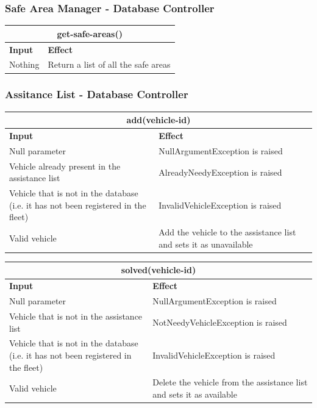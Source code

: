 \documentclass{article}
\begin{document}
\subsubsection{Safe Area Manager - Database Controller}
\begin{tabular}{ |p{5cm}|p{7cm}| }
  \hline
  \multicolumn{2}{|c|}{get-safe-areas()} \\
  \hline
  \textbf{Input} & \textbf{Effect} \\
  \hline
  Nothing & Return a list of all the safe areas\\
  \hline
\end{tabular}
\subsubsection{Assitance List - Database Controller}
\begin{tabular}{ |p{5cm}|p{7cm}| }
  \hline
  \multicolumn{2}{|c|}{add(vehicle-id)} \\
  \hline
  \textbf{Input} & \textbf{Effect} \\
  \hline
  Null parameter & NullArgumentException is raised\\
  \hline
  Vehicle already present in the assistance list & AlreadyNeedyException is raised\\
  \hline
  Vehicle that is not in the database (i.e. it has not been registered in the fleet) & InvalidVehicleException is raised\\
  \hline
  Valid vehicle & Add the vehicle to the assistance list and sets it as unavailable\\
  \hline
\end{tabular}
\newline
\begin{tabular}{ |p{5cm}|p{7cm}| }
  \hline
  \multicolumn{2}{|c|}{solved(vehicle-id)} \\
  \hline
  \textbf{Input} & \textbf{Effect} \\
  \hline
  Null parameter & NullArgumentException is raised\\
  \hline
  Vehicle that is not in the assistance list & NotNeedyVehicleException is raised\\
  \hline
  Vehicle that is not in the database (i.e. it has not been registered in the fleet) & InvalidVehicleException is raised\\
  \hline
  Valid vehicle & Delete the vehicle from the assistance list and sets it as available\\
  \hline
\end{tabular}
\end{document}
